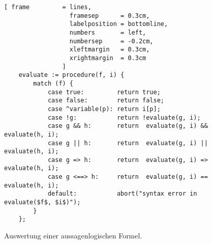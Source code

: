 \begin{figure}[!ht]
  \centering
\begin{Verbatim}[ frame         = lines, 
                  framesep      = 0.3cm, 
                  labelposition = bottomline,
                  numbers       = left,
                  numbersep     = -0.2cm,
                  xleftmargin   = 0.3cm,
                  xrightmargin  = 0.3cm
                ]
    evaluate := procedure(f, i) {
        match (f) {
            case true:         return true;
            case false:        return false;
            case ^variable(p): return i[p];
            case !g:           return !evaluate(g, i);
            case g && h:       return  evaluate(g, i) && evaluate(h, i);
            case g || h:       return  evaluate(g, i) || evaluate(h, i);
            case g => h:       return  evaluate(g, i) => evaluate(h, i);
            case g <==> h:     return  evaluate(g, i) == evaluate(h, i);
            default:           abort("syntax error in evaluate($f$, $i$)");
        }
    };
\end{Verbatim}
\vspace*{-0.3cm}
  \caption{Auswertung einer aussagenlogischen Formel.}
  \label{fig:evaluate.stlx}
\end{figure} 

